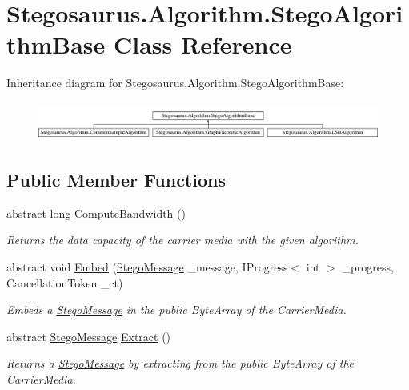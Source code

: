 \hypertarget{class_stegosaurus_1_1_algorithm_1_1_stego_algorithm_base}{}\section{Stegosaurus.\+Algorithm.\+Stego\+Algorithm\+Base Class Reference}
\label{class_stegosaurus_1_1_algorithm_1_1_stego_algorithm_base}
Inheritance diagram for Stegosaurus.\+Algorithm.\+Stego\+Algorithm\+Base\+:\begin{figure}[H]
\begin{center}
\leavevmode
\includegraphics[height=1.274175cm]{class_stegosaurus_1_1_algorithm_1_1_stego_algorithm_base}
\end{center}
\end{figure}
\subsection*{Public Member Functions}
\begin{DoxyCompactItemize}
\item 
abstract long \hyperlink{class_stegosaurus_1_1_algorithm_1_1_stego_algorithm_base_a2b4d2a0c3b65c980b5cbda2ab7601535}{Compute\+Bandwidth} ()
\begin{DoxyCompactList}\small\item\em Returns the data capacity of the carrier media with the given algorithm. \end{DoxyCompactList}\item 
abstract void \hyperlink{class_stegosaurus_1_1_algorithm_1_1_stego_algorithm_base_aa0d6b5f8f24d0ef5f9f2126b32cbad47}{Embed} (\hyperlink{class_stegosaurus_1_1_stego_message}{Stego\+Message} \+\_\+message, I\+Progress$<$ int $>$ \+\_\+progress, Cancellation\+Token \+\_\+ct)
\begin{DoxyCompactList}\small\item\em Embeds a \hyperlink{class_stegosaurus_1_1_stego_message}{Stego\+Message} in the public Byte\+Array of the Carrier\+Media. \end{DoxyCompactList}\item 
abstract \hyperlink{class_stegosaurus_1_1_stego_message}{Stego\+Message} \hyperlink{class_stegosaurus_1_1_algorithm_1_1_stego_algorithm_base_a069eef0b17aa0221d2c111925b8d735a}{Extract} ()
\begin{DoxyCompactList}\small\item\em Returns a \hyperlink{class_stegosaurus_1_1_stego_message}{Stego\+Message} by extracting from the public Byte\+Array of the Carrier\+Media. \end{DoxyCompactList}\end{DoxyCompactItemize}

